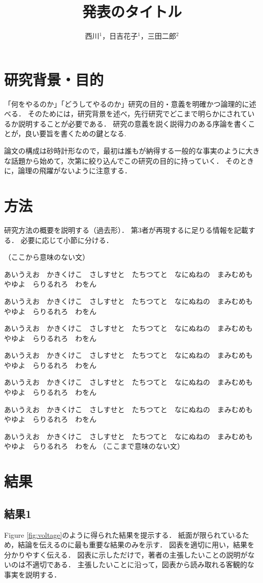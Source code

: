\documentclass[twocolumn]{jsarticle}
\title{発表のタイトル}
\author{西川$^1$，日吉花子$^1$，三田二郎$^2$}
\begin{document}
\maketitle

\section{研究背景・目的}
「何をやるのか」「どうしてやるのか」研究の目的・意義を明確かつ論理的に述べる．
そのためには，研究背景を述べ，先行研究\cite{bunken1}でどこまで明らかにされているか説明することが必要である．
研究の意義を説く説得力のある序論を書くことが，良い要旨を書くための鍵となる\cite{bunken2}.

論文の構成は砂時計形なので，最初は誰もが納得する一般的な事実のように大きな話題から始めて，次第に絞り込んでこの研究の目的に持っていく．
そのときに，論理の飛躍がないように注意する．

\section{方法}
研究方法の概要を説明する（過去形）．
第3者が再現するに足りる情報を記載する．
必要に応じて小節に分ける．

（ここから意味のない文）

あいうえお　かきくけこ　さしすせと　たちつてと　なにぬねの　まみむめも　やゆよ　らりるれろ　わをん

あいうえお　かきくけこ　さしすせと　たちつてと　なにぬねの　まみむめも　やゆよ　らりるれろ　わをん

あいうえお　かきくけこ　さしすせと　たちつてと　なにぬねの　まみむめも　やゆよ　らりるれろ　わをん

あいうえお　かきくけこ　さしすせと　たちつてと　なにぬねの　まみむめも　やゆよ　らりるれろ　わをん

あいうえお　かきくけこ　さしすせと　たちつてと　なにぬねの　まみむめも　やゆよ　らりるれろ　わをん

あいうえお　かきくけこ　さしすせと　たちつてと　なにぬねの　まみむめも　やゆよ　らりるれろ　わをん

あいうえお　かきくけこ　さしすせと　たちつてと　なにぬねの　まみむめも　やゆよ　らりるれろ　わをん
（ここまで意味のない文）

\section{結果}
\subsection{結果1}
Figure \ref{fig:voltage}のように得られた結果を提示する．
紙面が限られているため，結論を伝えるのに最も重要な結果のみを示す．
図表を適切に用い，結果を分かりやすく伝える．
図表に示しただけで，著者の主張したいことの説明がないのは不適切である．
主張したいことに沿って，図表から読み取れる客観的な事実を説明する．
\end{document}
